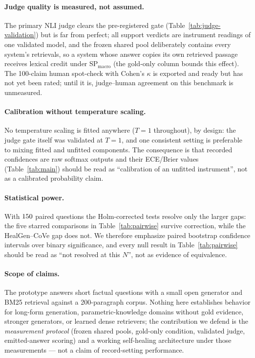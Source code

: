 \paragraph{Judge quality is measured, not assumed.}
The primary NLI judge clears the pre-registered gate
(Table~\ref{tab:judge-validation}) but is far from perfect; all support
verdicts are instrument readings of one validated model, and the
frozen shared pool deliberately contains every system's retrievals, so a
system whose answer copies its own retrieved passage receives lexical
credit under SP$_{\text{macro}}$ (the gold-only column bounds this
effect).  The 100-claim human spot-check with Cohen's $\kappa$ is
exported and ready but has not yet been rated; until it is, judge--human
agreement on this benchmark is unmeasured.

\paragraph{Calibration without temperature scaling.}
No temperature scaling is fitted anywhere ($T{=}1$ throughout), by
design: the judge gate itself was validated at $T{=}1$, and one
consistent setting is preferable to mixing fitted and unfitted
components.  The
consequence is that recorded confidences are raw softmax outputs and
their ECE/Brier values (Table~\ref{tab:main}) should be read as
``calibration of an unfitted instrument'', not as a calibrated
probability claim.

\paragraph{Statistical power.}
With $150$ paired questions the Holm-corrected tests resolve only
the larger gaps: the five starred comparisons in
Table~\ref{tab:pairwise} survive correction, while the
HealGen--CoVe gap does not.  We therefore
emphasize paired bootstrap confidence intervals over binary
significance, and every null result in
Table~\ref{tab:pairwise} should be read as ``not resolved at this
$N$'', not as evidence of equivalence.

\paragraph{Scope of claims.}
The prototype answers short factual questions with a small open
generator and BM25 retrieval against a 200-paragraph corpus.  Nothing
here establishes behavior for long-form generation, parametric-knowledge
domains without gold evidence, stronger generators, or learned dense
retrievers; the contribution we defend is the \emph{measurement
protocol} (frozen shared pools, gold-only condition, validated judge,
emitted-answer scoring) and a working self-healing architecture under
those measurements --- not a claim of record-setting performance.
